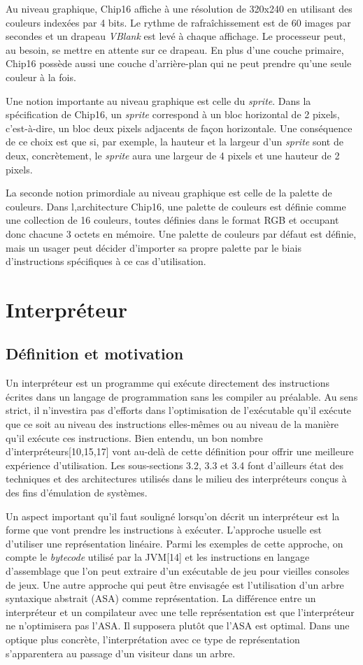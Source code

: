 \documentclass{article} %
\begin{document}
Au niveau graphique, Chip16 affiche à une résolution de 320x240 en utilisant des couleurs indexées par 4 bits. Le rythme de rafraîchissement est de 60 images par secondes et un drapeau \textit{VBlank} est levé à chaque affichage. Le processeur peut, au besoin, se mettre en attente sur ce drapeau. En plus d'une couche primaire, Chip16 possède aussi une couche d'arrière-plan qui ne peut prendre qu'une seule couleur à la fois. 

Une notion importante au niveau graphique est celle du \textit{sprite}. Dans la spécification de Chip16, un \textit{sprite} correspond à un bloc horizontal de 2 pixels, c'est-à-dire, un bloc deux pixels adjacents de façon horizontale. Une conséquence de ce choix est que si, par exemple, la hauteur et la largeur d'un \textit{sprite} sont de deux, concrètement, le \textit{sprite} aura une largeur de 4 pixels et une hauteur de 2 pixels.

La seconde notion primordiale au niveau graphique est celle de la palette de couleurs. Dans l,architecture Chip16, une palette de couleurs est définie comme une collection de 16 couleurs, toutes définies dans le format RGB et occupant donc chacune 3 octets en mémoire. Une palette de couleurs par défaut est définie, mais un usager peut décider d'importer sa propre palette par le biais d'instructions spécifiques à ce cas d'utilisation.

\section{Interpréteur}
\subsection{Définition et motivation}
Un interpréteur est un programme qui exécute directement des instructions écrites dans un langage de programmation sans les compiler au préalable. Au sens strict, il n'investira pas d'efforts dans l'optimisation de l'exécutable qu'il exécute que ce soit au niveau des instructions elles-mêmes ou au niveau de la manière qu'il exécute ces instructions. Bien entendu, un bon nombre d'interpréteurs[10,15,17] vont au-delà de cette définition  pour offrir une meilleure expérience d'utilisation. Les sous-sections 
3.2, 3.3 et 3.4 font d'ailleurs état des techniques et des architectures utilisés dans le milieu des interpréteurs conçus à des fins d'émulation de systèmes.

Un aspect important qu'il faut souligné lorsqu'on décrit un interpréteur est la forme que vont prendre les instructions à exécuter. L'approche usuelle est d'utiliser une représentation linéaire. Parmi les exemples de cette approche, on compte le \textit{bytecode} utilisé par la JVM[14] et les instructions en langage d'assemblage que l'on peut extraire d'un exécutable de jeu pour vieilles consoles de jeux. Une autre approche qui peut être envisagée est l'utilisation d'un arbre syntaxique abstrait (ASA) comme représentation. La différence entre un interpréteur et un compilateur avec une telle représentation est que l'interpréteur ne n'optimisera pas l'ASA. Il supposera plutôt que l'ASA est optimal. Dans une optique plus concrète, l'interprétation avec ce type de représentation s'apparentera au passage d'un visiteur dans un arbre.
\end{document}
